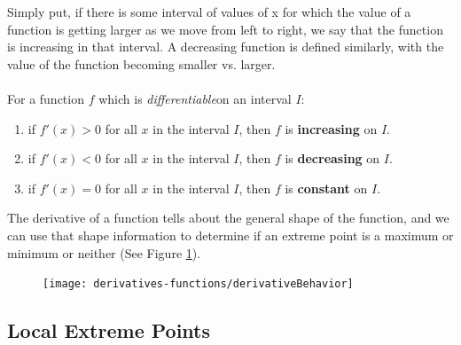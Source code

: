 \begin{tcolorbox}[title = {Increasing and Decreasing Functions in an interval}]
    Simply put, if there is some interval of values of x for which the value of a function is getting larger as we move from left to right, we say that the function is increasing in that interval.  A decreasing function is defined similarly, with the value of the function becoming smaller vs. larger.\\\\
    For a function \(f\) which is \emph{differentiable}\footnotemark on an interval \(I\):
\renewcommand{\labelenumii}{\roman{enumii}}
\begin{enumerate}
    \item if \(f'(x)>0\) for all \(x\) in the interval \(I\), then \(f\) is \textbf{increasing} on \(I\).
     \item if \(f'(x)<0\) for all \(x\) in the interval \(I\), then \(f\) is \textbf{decreasing} on \(I\).
      \item if \(f'(x)=0\) for all \(x\) in the interval \(I\), then \(f\) is \textbf{constant} on \(I\).
\end{enumerate}
\end{tcolorbox}

\noindent The derivative of a function tells about the general shape of the function, and we can use that shape information to determine if an extreme point is a maximum or minimum or neither (See Figure \ref{fig:dervBeh2}).

\begin{figure}[h]
    \centering
    \caption{} \footnotemark
    \texttt{[image: derivatives-functions/derivativeBehavior]} 
    \label{fig:dervBeh2}
\end{figure}


\subsection*{Local Extreme Points}

